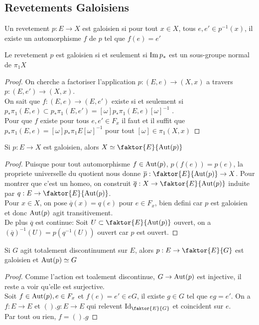 \documentclass[../main.tex]{subfiles}
\begin{document}
\subsection{Revetements Galoisiens}
\begin{defn}
	Un revetement $p:E\to X$ est galoisien si pour tout $x\in X$, tous $e,e' \in p^{-1}( x) $, il existe un automorphisme $f$ de $p$ tel que $f( e  ) = e'$ 
\end{defn}
\begin{propo}
Le revetement $p$ est galoisien si et seulement si $\operatorname{Im} p_\ast $ est un sous-groupe normal de $\pi_1X$ 
\end{propo}
\begin{proof}
On cherche a factoriser l'application $p: ( E,e) \to ( X,x) $ a travers $p: ( E,e') \to ( X,x) $.\\
On sait que $f: ( E,e) \to ( E,e') $ existe si et seulement si $p_\ast \pi_1( E,e) \subset p_\ast \pi_1 ( E,e') = [ \omega] p_\ast \pi_1( E,e) [ \omega]^{-1}$ .\\
Pour que $f$ existe pour tous $e,e'\in F_x$ il faut et il suffit que $p_\ast \pi_1( E,e) = [ \omega] p_\ast\pi_1E [ \omega]^{-1}$ pour tout $[\omega] \in \pi_1( X,x) $ 
\end{proof}
\begin{propo}
Si $p:E\to X$ est galoisien, alors $X \simeq \faktor{E}{\aut( p) }$ 
\end{propo}
\begin{proof}
Puisque pour tout automorphisme $f\in \operatorname{Aut}( p) $, $p( f( e ) ) = p( e ) $, la propriete universelle du quotient nous donne $ \overline{p}: \faktor{E}{\aut( p) }\to X$. Pour montrer que c'est un homeo, on construit $\overline{q}:X \to \faktor{E}{\aut( p) }$ induite par $q:E\to \faktor{E}{\aut( p) }$.\\
Pour $x\in X$, on pose $ \overline{q}( x) = q( e ) $ pour $e\in F_x$, bien defini car $p$ est galoisien et donc $\operatorname{Aut}( p)$ agit transitivement.\\
De plus $ \overline{q}$ est continue: Soit $U \subset  \faktor{E}{\aut( p) }$ ouvert, on a $ ( \overline{q} )^{-1}( U) = p( q^{-1}( U) ) $ ouvert car $p$ est ouvert. 
\end{proof}
\begin{propo}
Si $G$ agit totalement discontinument sur $E$, alors $p: E\to \faktor{E}{G}$ est galoisien et $\operatorname{Aut}( p) \simeq G$  
\end{propo}
\begin{proof}
Comme l'action est toalement discontinue, $G\to \operatorname{Aut}( p) $ est injective, il reste a voir qu'elle est surjective.\\
Soit $f\in \operatorname{Aut}( p) ,  e\in F_x$ et $f(  e )= e'\in eG $, il existe $g\in G$ tel que $eg = e'$. On a $f:E\to E$ et $( ) .g:E\to E$ qui relevent $\id_{ \faktor{E}{G}} $	et coincident sur $e$.\\
Par tout ou rien, $f= ( ).g$ 
\end{proof}
\end{document}
